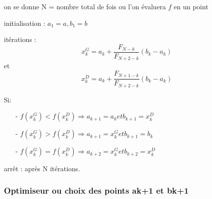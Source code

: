 \documentclass[a4paper,14pt]{article}
\begin{document}
\begin{list}{•}{ }

\item on se donne N = nombre total de fois ou l'on évaluera $f$ en un point
\item initialisation : $a_{1} = a, b_{1} = b$
\item itérations : \[x_{k}^{G} = a_{k} + \frac{F_{N-k}}{F_{N+2-k}}(b_{k} - a_{k})\]  et \[x_{k}^{D} = a_{k} + \frac{F_{N+1-k}}{F_{N+2-k}}(b_{k}-a_{k})\]
\item Si:
\begin{itemize}
\item[-] $f(x_{k}^{G}) < f(x_{k}^{D}) \Longrightarrow a_{k+1} = a_{k} et b_{k+1} = x_{k}^{D}$
\item[-] $f(x_{k}^{G}) > f(x_{k}^{D}) \Longrightarrow a_{k+1} = x_{k}^{G} et b_{k+1} = b_{k}$
\item[-] $f(x_{k}^{G}) = f(x_{k}^{D}) \Longrightarrow a_{k+2} = x_{k}^{G} et b_{k+2} = x_{k}^{D}$
\end{itemize}

\item arrêt : après N itérations.
    
\end{list}

\subsubsection{Optimiseur ou choix des points ak+1 et bk+1}
\end{document}
